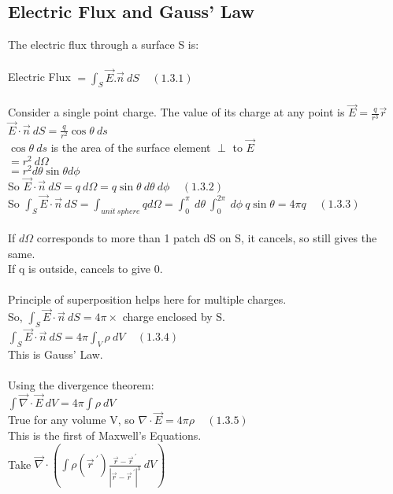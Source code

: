 \documentclass[a4paper,11pt]{article}
\begin{document}
\subsection{Electric Flux and Gauss' Law}

The electric flux through a surface S is:\\
\\
Electric Flux $= \int _S \vec{E} . \vec{n} ~dS ~~~~~(1.3.1)$\\
\\
Consider a single point charge. The value of its charge at any point is $\vec{E} = \frac{q}{r^3}\vec{r}$\\
$\vec{E} \cdot \vec{n} ~dS = \frac{q}{r^2}\cos{\theta} ~ds$\\
$\cos{\theta} ~ds$ is the area of the surface element $\perp$ to $\vec{E}$\\
$=r^2 ~d\Omega $\\
$=r^2 d\theta \sin{\theta} d\phi $\\
So $\vec{E} \cdot \vec{n} ~dS = q~d\Omega = q \sin{\theta} ~d\theta ~d\phi ~~~~~(1.3.2)$\\
So $\int_S \vec{E} \cdot \vec{n} ~dS = \int _{unit~sphere} q d\Omega = \int ^{\pi} _0 ~d\theta ~\int^{2\pi} _0 ~d\phi ~ q \sin{\theta}=4\pi q ~~~~~(1.3.3)$\\
\\
If $d\Omega$ corresponds to more than 1 patch dS on S, it cancels, so still gives the same.\\
If q is outside, cancels to give 0.\\
\\
Principle of superposition helps here for multiple charges.\\
So, $\int_S \vec{E} \cdot \vec{n} ~dS = 4\pi \times$ charge enclosed by S.\\
$\int_S \vec{E} \cdot \vec{n} ~dS = 4\pi \int_V \rho ~dV ~~~~~ (1.3.4)$\\
This is Gauss' Law.\\
\\
Using the divergence theorem:\\
$\int \vec{\nabla} \cdot \vec{E} ~dV = 4\pi \int \rho ~dV$\\
True for any volume V, so $\nabla \cdot \vec{E} = 4\pi \rho ~~~~~(1.3.5)$\\
This is the first of Maxwell's Equations.\\
Take $\vec{\nabla} \cdot ( \int \rho (\vec{r}^{~'}) \frac{\vec{r} - \vec{r}^{~'}}{|\vec{r} - \vec{r}^{~'}|^3}~dV)$\\
\end{document}
